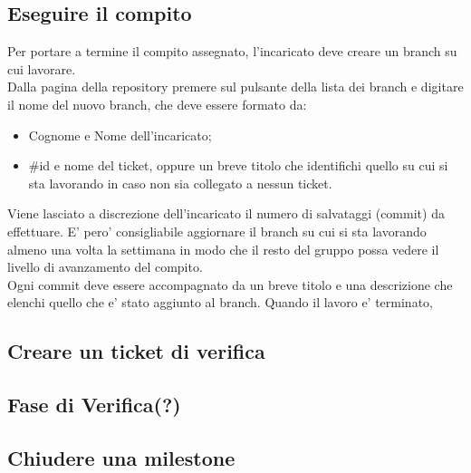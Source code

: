 \subsection{Eseguire il compito}
Per portare a termine il compito assegnato, l'incaricato deve creare un branch su cui lavorare. \\
Dalla pagina della repository premere sul pulsante della lista dei branch e digitare il nome del nuovo branch, che deve essere formato da:
    \begin{itemize}
    \item Cognome e Nome dell'incaricato;
    \item \#id e nome del ticket, oppure un breve titolo che identifichi quello su cui si sta lavorando in caso non sia collegato a nessun ticket.
    \end{itemize}
    Viene lasciato a discrezione dell'incaricato il numero di salvataggi (commit) da effettuare. E' pero' consigliabile aggiornare il branch su cui si sta lavorando almeno una volta la settimana in modo che il resto del gruppo possa vedere il livello di avanzamento del compito. \\
    Ogni commit deve essere accompagnato da un breve titolo e una descrizione che elenchi quello che e' stato aggiunto al branch.
    Quando il lavoro e' terminato,

\subsection{Creare un ticket di verifica}
\subsection{Fase di Verifica(?)}
\subsection{Chiudere una milestone}